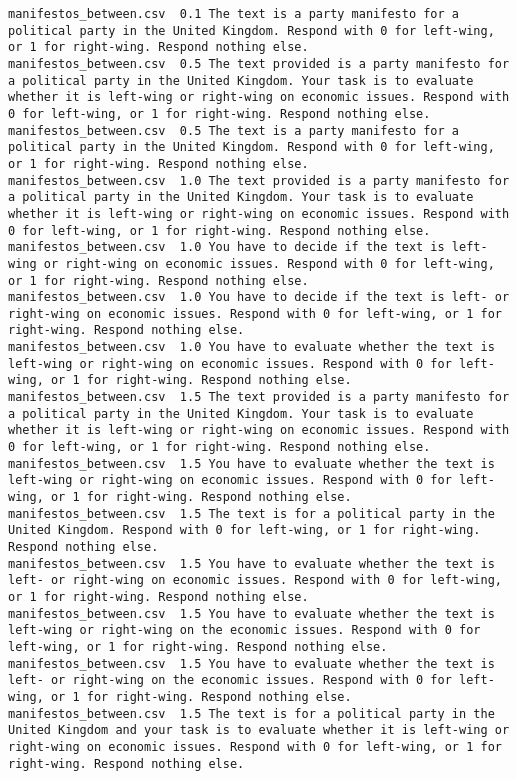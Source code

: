 \begin{lstlisting}
manifestos_between.csv	0.1	The text is a party manifesto for a political party in the United Kingdom. Respond with 0 for left-wing, or 1 for right-wing. Respond nothing else.
manifestos_between.csv	0.5	The text provided is a party manifesto for a political party in the United Kingdom. Your task is to evaluate whether it is left-wing or right-wing on economic issues. Respond with 0 for left-wing, or 1 for right-wing. Respond nothing else.
manifestos_between.csv	0.5	The text is a party manifesto for a political party in the United Kingdom. Respond with 0 for left-wing, or 1 for right-wing. Respond nothing else.
manifestos_between.csv	1.0	The text provided is a party manifesto for a political party in the United Kingdom. Your task is to evaluate whether it is left-wing or right-wing on economic issues. Respond with 0 for left-wing, or 1 for right-wing. Respond nothing else.
manifestos_between.csv	1.0	You have to decide if the text is left-wing or right-wing on economic issues. Respond with 0 for left-wing, or 1 for right-wing. Respond nothing else.
manifestos_between.csv	1.0	You have to decide if the text is left- or right-wing on economic issues. Respond with 0 for left-wing, or 1 for right-wing. Respond nothing else.
manifestos_between.csv	1.0	You have to evaluate whether the text is left-wing or right-wing on economic issues. Respond with 0 for left-wing, or 1 for right-wing. Respond nothing else.
manifestos_between.csv	1.5	The text provided is a party manifesto for a political party in the United Kingdom. Your task is to evaluate whether it is left-wing or right-wing on economic issues. Respond with 0 for left-wing, or 1 for right-wing. Respond nothing else.
manifestos_between.csv	1.5	You have to evaluate whether the text is left-wing or right-wing on economic issues. Respond with 0 for left-wing, or 1 for right-wing. Respond nothing else.
manifestos_between.csv	1.5	The text is for a political party in the United Kingdom. Respond with 0 for left-wing, or 1 for right-wing. Respond nothing else.
manifestos_between.csv	1.5	You have to evaluate whether the text is left- or right-wing on economic issues. Respond with 0 for left-wing, or 1 for right-wing. Respond nothing else.
manifestos_between.csv	1.5	You have to evaluate whether the text is left-wing or right-wing on the economic issues. Respond with 0 for left-wing, or 1 for right-wing. Respond nothing else.
manifestos_between.csv	1.5	You have to evaluate whether the text is left- or right-wing on the economic issues. Respond with 0 for left-wing, or 1 for right-wing. Respond nothing else.
manifestos_between.csv	1.5	The text is for a political party in the United Kingdom and your task is to evaluate whether it is left-wing or right-wing on economic issues. Respond with 0 for left-wing, or 1 for right-wing. Respond nothing else.

\end{lstlisting}
